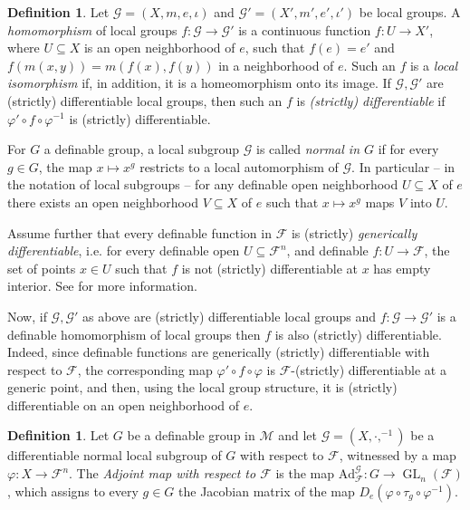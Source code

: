\documentclass[11pt]{amsart}
\DeclareMathOperator{\gl}{GL} \DeclareMathOperator{\agl}{AGL}
\theoremstyle{definition}
\newtheorem{definition}[theorem]{Definition}
\newcommand{\CM}{{\mathcal M}}
\newcommand{\CF}{{\mathscr F}}
\newcommand{\CG}{{\mathcal G}}
\newcommand{\0}{\emptyset}
\renewcommand{\phi}{\varphi}
\newcommand{\ad}{\mathrm{Ad}}
\def\sub{\subseteq}
\begin{document}
\begin{definition}
    Let $\mathcal{G}=(X,m, e, \iota)$ and $\mathcal{G}'=(X',m', e', \iota')$ be local groups. A \emph{ homomorphism}  of local groups $f:\mathcal{G}\to\mathcal{G}'$  is a continuous function $f: U\to X'$, where $U\sub X$ is an open neighborhood of $e$, such that $f(e)=e'$ and $f(m(x,y))=m(f(x), f(y))$ in a neighborhood of $e$. Such an $f$ is a \emph{local isomorphism} if, in addition, it is a homeomorphism onto its image.     If $\CG, \CG'$ are (strictly) differentiable local groups, then such an $f$ is \emph{(strictly) differentiable} if $\varphi'\circ f\circ \varphi^{-1}$ is (strictly) differentiable. 

    For $G$ a definable group, a local subgroup $\CG$ is called \emph{normal in $G$}  if for every $g\in G$, the map $x\mapsto x^g$ restricts to  a local automorphism of $\CG$. In particular -- in the notation of local subgroups --  for any definable open neighborhood $U\sub X$ of $e$ there exists an open neighborhood $V\subseteq X$ of $e$ such that $x\mapsto x^g$ maps $V$ into $U$.
\end{definition}

Assume further that  every definable function in $\CF$  is (strictly) \emph{generically differentiable}, i.e. for every definable open $U\subseteq \CF^n$, and definable $f:U\to \CF$,  the set of points $x\in U$ such that $f$ is not (strictly) differentiable at $x$ has empty interior. See \cite[Section 4.3]{HaHaPeVF} for more information.

Now, if $\CG, \CG'$ as above are (strictly) differentiable local groups and $f:\CG\to \CG'$ is a definable homomorphism of local groups then $f$  is also (strictly) differentiable. Indeed, since definable functions are generically (strictly) differentiable with respect to $\CF$, the corresponding map $\phi'\circ f\circ \phi$ is $\CF$-(strictly) differentiable at a generic point, and then, using the local group structure, it is (strictly) differentiable  on an open neighborhood of $e$.
\begin{definition}
    
\label{N:Ad}
Let $G$ be a definable group in $\CM$ and let  $\mathcal{G}=(X,\cdot,^{-1})$  be a differentiable normal local  subgroup of $G$ with respect to  $\CF$, witnessed by a map $\varphi:X\to \CF^n$.   The {\em Adjoint map with respect to $\CF$} is the map $\ad^{\CG}_\CF:G\to \gl_n(\CF)$, which assigns to every $g\in G$ the Jacobian matrix of the map $D_e(\varphi\circ \tau_g\circ\varphi^{-1})$.
\end{definition}
\end{document}
